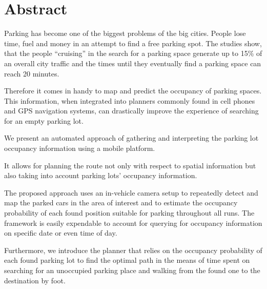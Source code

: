 \chapter*{Abstract}
\label{cha:abstract}

Parking has become one of the biggest problems of the big cities. People lose
time, fuel and money in an attempt to find a free parking spot. The studies
show, that the people ``cruising'' in the search for a parking space generate
up to 15\% of an overall city traffic and the times until they eventually find
a parking space can reach 20 minutes.

Therefore it comes in handy to map and predict the occupancy of parking
spaces. This information, when integrated into planners commonly found in cell
phones and GPS navigation systems, can drastically improve the experience of
searching for an empty parking lot.

We present an automated approach of gathering and interpreting the parking lot
occupancy information using a mobile platform.

It allows for planning the route not only with respect to spatial information
but also taking into account parking lots' occupancy information.

The proposed approach uses an in-vehicle camera setup to repeatedly detect and
map the parked cars in the area of interest and to estimate the occupancy
probability of each found position suitable for parking throughout all runs.
The framework is easily expendable to account for querying for occupancy
information on specific date or even time of day.

Furthermore, we introduce the planner that relies on the occupancy
probability of each found parking lot to find the optimal path in the means of
time spent on searching for an unoccupied parking place and walking from the
found one to the destination by foot.



